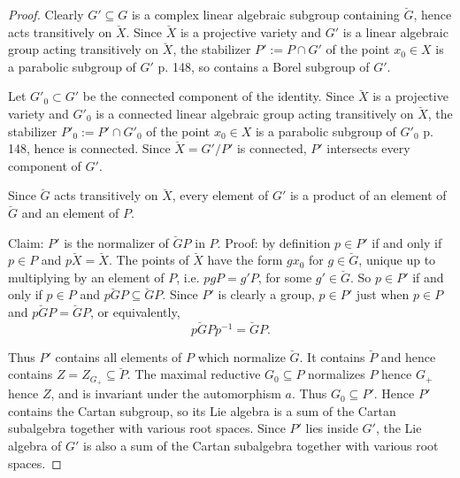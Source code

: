 \documentclass[a4paper,10pt]{amsart}
\theoremstyle{remark}
\begin{document}
\begin{proof}
Clearly \(G'\subseteq G\) is a complex linear algebraic subgroup containing \(\breve{G}\), hence acts transitively on \(\breve{X}\).
Since \(\breve{X}\) is a projective variety and \(G'\) is a linear algebraic group acting transitively on \(\breve{X}\), the stabilizer \(P':=P\cap G'\) of the point \(x_0\in X\) is a parabolic subgroup of \(G'\) \cite{Borel:1991} p. 148, so contains a Borel subgroup of \(G'\).

Let \(G'_0\subset G'\) be the connected component of the identity.
Since \(\breve{X}\) is a projective variety and \(G'_0\) is a connected linear algebraic group acting transitively on \(\breve{X}\), the stabilizer \(P'_0:=P'\cap G'_0\) of the point \(x_0\in X\) is a parabolic subgroup of \(G'_0\) \cite{Borel:1991} p. 148, hence is connected.
Since \(\breve{X}=G'/P'\) is connected, \(P'\) intersects every component of \(G'\).

Since \(\breve{G}\) acts transitively on \(\breve{X}\), every element of \(G'\) is a product of an element of \(\breve{G}\) and an element of \(P\).

Claim: \(P'\) is the normalizer of \(\breve{G}P\) in \(P\).
Proof: by definition \(p\in P'\) if and only if \(p\in P\) and \(p\breve{X}=\breve{X}\).
The points of \(\breve{X}\) have the form \(gx_0\) for \(g\in\breve{G}\), unique up to multiplying by an element of \(P\), i.e. \(pgP=g'P\), for some \(g'\in\breve{G}\).
So \(p\in P'\) if and only if \(p\in P\) and \(p\breve{G}P\subseteq\breve{G}P\).
Since \(P'\) is clearly a group, \(p\in P'\) just when \(p\in P\) and \(p\breve{G}P=\breve{G}P\), or equivalently, 
\[
p\breve{G}Pp^{-1}=\breve{G}P.
\]

Thus \(P'\) contains all elements of \(P\) which normalize \(\breve{G}\).
It contains \(\breve{P}\) and hence contains \(Z=Z_{G_+}\subseteq\breve{P}\).
The maximal reductive \(G_0\subseteq P\) normalizes \(P\) hence \(G_+\) hence \(Z\), and is invariant under the automorphism \(a\).
Thus \(G_0\subseteq P'\).
Hence \(P'\) contains the Cartan subgroup, so its Lie algebra is a sum of the Cartan subalgebra together with various root spaces.
Since \(P'\) lies inside \(G'\), the Lie algebra of \(G'\) is also a sum of the Cartan subalgebra together with various root spaces.


\end{proof}
\end{document}
